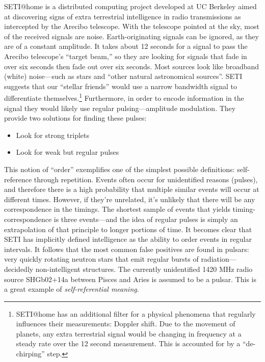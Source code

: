 \documentclass{thesis}
\begin{document}
	SETI@home\cite{seti_about_????} is a distributed computing project developed at UC Berkeley aimed at discovering signs of extra terrestrial intelligence in radio transmissions as intercepted by the Arecibo telescope. With the telescope pointed at the sky, most of the received signals are noise. Earth-originating signals can be ignored, as they are of a constant amplitude. It takes about 12 seconds for a signal to pass the Arecibo telescope's ``target beam,'' so they are looking for signals that fade in over six seconds then fade out over six seconds. Most sources look like broadband (white) noise---such as stars and ``other natural astronomical sources''. SETI suggests that our ``stellar friends'' would use a narrow bandwidth signal to differentiate themselves.\footnote{SETI@home has an additional filter for a physical phenomena that regularly influences their measurements: Doppler shift. Due to the movement of planets, any extra terrestrial signal would be changing in frequency at a steady rate over the 12 second measurement. This is accounted for by a ``de-chirping'' step.} Furthermore, in order to encode information in the signal they would likely use regular pulsing---amplitude modulation. They provide two solutions for finding these pulses:
	
	\begin{itemize}
	\item Look for strong triplets
	\item Look for weak but regular pulses
	\end{itemize}
	
	This notion of ``order'' exemplifies one of the simplest possible definitions: self-reference through repetition. Events often occur for unidentified reasons (pulses), and therefore there is a high probability that multiple similar events will occur at different times. However, if they're unrelated, it's unlikely that there will be any correspondence in the timings. The shortest sample of events that yields timing-correspondence is three events---and the idea of regular pulses is simply an extrapolation of that principle to longer portions of time. It becomes clear that SETI has implicitly defined intelligence as the ability to order events in regular intervals. It follows that the most common false positives are found in pulsars: very quickly rotating neutron stars that emit regular bursts of radiation---decidedly non-intelligent structures. The currently unidentified 1420 MHz radio source SHGb02+14a between Pisces and Aries is assumed to be a pulsar.\cite{eugenie_samuel_reich_mysterious_2004} This is a great example of \emph{self-referential meaning}.
	
\end{document}
